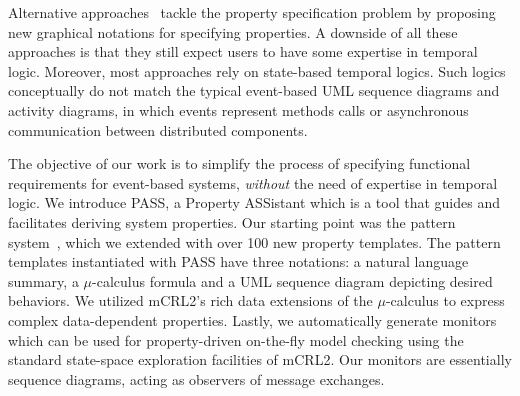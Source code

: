 \documentclass[letter]{llncs}
\begin{document}
Alternative
approaches~\cite{Autili:2007:GSS:1290845.1290859,Lee97agraphical,Smith:2001:ECG:882477.883639,Knapp:2006:MCU:1762828.1762836,Lilius99vuml:a,Kugler:2005:TLS:2140653.2140692,MVPSA}
tackle the property specification problem by proposing new graphical
notations for specifying properties. A downside of all these approaches is
that they still expect users to have some expertise in temporal logic.
Moreover, most approaches rely on state-based temporal logics. Such
logics conceptually do not match the typical event-based UML sequence
diagrams and activity diagrams, in which events represent methods calls
or asynchronous communication between distributed components.

The objective of our work is to simplify the process of specifying
functional requirements for event-based systems, \emph{without}
the need of expertise in temporal logic.  We introduce PASS,
a Property ASSistant which is a tool that guides and facilitates 
deriving system properties. Our starting point was the pattern
system~\cite{Dwyer:1999:PPS:302405.302672}, which we extended with over
100 new property templates. 
The pattern templates instantiated with PASS have three notations:
a natural language summary, a $\mu$-calculus formula and a UML sequence
diagram depicting desired behaviors.  We utilized mCRL2's rich data
extensions of the $\mu$-calculus to express complex data-dependent
properties.  Lastly, we automatically generate
monitors which can be used for property-driven on-the-fly model checking
using the standard state-space exploration facilities
of mCRL2.
Our monitors are essentially sequence diagrams,  acting as
observers of message exchanges.
\end{document}
